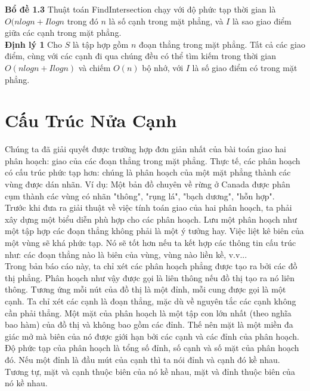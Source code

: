\documentclass[15pt]{article}
\begin{document}
{\textbf{Bổ đề 1.3} Thuật toán FindIntersection chạy với độ phức tạp thời gian là $O(n log n + I log n$ trong đó $n$ là số cạnh trong mặt phẳng, và $I$ là sao giao điểm giữa các cạnh trong mặt phẳng. \\

\textbf{Định lý 1} Cho $S$ là tập hợp gồm $n$ đoạn thẳng trong mặt phẳng. Tất cả các giao điểm, cùng với các cạnh đi qua chúng đều có thể tìm kiếm trong thời gian $O(n log n + I log n)$ và chiếm $O(n)$ bộ nhớ, với $I$ là số giao điểm có trong mặt phẳng.

\section{Cấu Trúc Nửa Cạnh}
Chúng ta đã giải quyết được trường hợp đơn giản nhất của bài toán giao hai phân hoạch: giao của các đoạn thẳng trong mặt phẳng. Thực tế, các phân hoạch có cấu trúc phức tạp hơn: chúng là phân hoạch của một mặt phẳng thành các vùng được dán nhãn. Ví dụ: Một bản đồ chuyên về rừng ở Canada được phân cụm thành các vùng có nhãn "thông", "rụng lá", "bạch dương", "hỗn hợp".\\
Trước khi đưa ra giải thuật về việc tính toán giao của hai phân hoạch, ta phải xây dựng một biểu diễn phù hợp cho các phân hoạch. Lưu một phân hoạch như một tập hợp các đoạn thẳng không phải là một ý tưởng hay. Việc liệt kê biên của một vùng sẽ khá phức tạp. Nó sẽ tốt hơn nếu ta kết hợp các thông tin cấu trúc như: các đoạn thẳng nào là biên của vùng, vùng nào liền kề, v.v...\\

Trong bản báo cáo này, ta chỉ xét các phân hoạch phẳng được tạo ra bởi các đồ thị phẳng. Phân hoạch như vậy được gọi là liên thông nếu đồ thị tạo ra nó liên thông. Tương ứng mỗi nút của đồ thị là một đỉnh, mỗi cung được gọi là một cạnh. Ta chỉ xét các cạnh là đoạn thẳng, mặc dù về nguyên tắc các cạnh không cần phải thẳng. Một mặt của phân hoạch là một tập con lớn nhất (theo nghĩa bao hàm) của đồ thị và không bao gồm các đỉnh. Thế nên mặt là một miền đa giác mở mà biên của nó được giới hạn bởi các cạnh và các đỉnh của phân hoạch. Độ phức tạp của phân hoạch là tổng số đỉnh, số cạnh và số mặt của phân hoạch đó. Nếu một đỉnh là đầu mút của cạnh thì ta nói đỉnh và cạnh đó kề nhau. Tương tự, mặt và cạnh thuộc biên của nó kề nhau, mặt và đỉnh thuộc biên của nó kề nhau. \\

}
\end{document}
